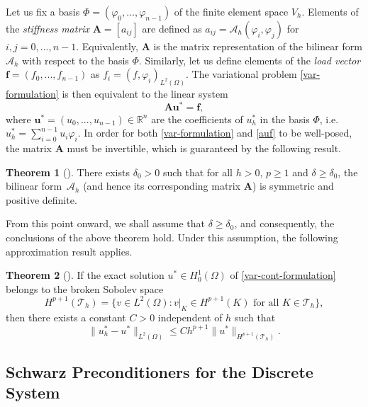 \documentclass[11pt]{article}
\theoremstyle{definition}
\theoremstyle{theorem}
\newtheorem{theorem}{Theorem}
\begin{document}
Let us fix a basis $\Phi=(\varphi_0, ..., \varphi_{n-1})$ of the finite element space $V_h$.
Elements of the \emph{stiffness matrix} ${\bm{A}=\left[a_{ij}\right]}$ are defined
as $a_{ij} = \mathcal{A}_h(\varphi_i, \varphi_j)$ for $i,j=0,...,n-1$. Equivalently,
$\bm{A}$ is the matrix representation of the bilinear form $\mathcal{A}_h$
with respect to the basis $\Phi$.
Similarly, let us define elements of the \emph{load vector} $\bm{f}=(f_0, ..., f_{n - 1})$
as $f_i = (f, \varphi_i)_{L^2(\Omega)}$. The variational problem
\eqref{var-formulation} is then equivalent to the linear system
\begin{equation}
  \bm{A} \bm{u^*} = \bm{f},\label{auf}
\end{equation}
where $\bm{u^*}=(u_0, ..., u_{n - 1})\in\mathbb{R}^n$ are the coefficients
of $u_h^*$ in the basis $\Phi$, i.e. $u_h^*=\sum_{i=0}^{n-1} u_i \varphi_i$.
In order for both \eqref{var-formulation} and \eqref{auf} to
be well-posed, the matrix $\bm{A}$ must
be invertible, which is guaranteed by the following result.

\begin{theorem}[\cite{Ern-weighted-dg}]\label{thm:spd}
  There exists $\delta_0>0$ such that for all $h>0$, $p\geq 1$ and $\delta \geq \delta_0$,
  the bilinear form~$\mathcal{A}_h$ (and hence its corresponding matrix $\bm{A}$)
  is symmetric and positive definite.
\end{theorem}

From this point onward, we shall assume that $\delta \geq \delta_0$, and consequently,
the conclusions of the above theorem hold. Under this assumption, the
following approximation result applies.

\begin{theorem}[\cite{Ern-weighted-dg}]
  If the exact solution $u^*\in H_0^1(\Omega)$ of
  \eqref{var-cont-formulation} belongs to the broken Sobolev space
  \[
    H^{p+1}(\mathcal{T}_h)=\{v \in L^2(\Omega) : v|_K \in H^{p+1}(K) \text{ for all } K\in \mathcal{T}_h\},
  \]
  then there exists a constant $C>0$ independent of $h$ such that
  \[
    \|u_h^* - u^*\|_{L^2(\Omega)} \leq C h^{p+1} \|u^*\|_{H^{p+1}(\mathcal{T}_h)}.
  \]
\end{theorem}

\subsection{Schwarz Preconditioners for the Discrete System}
\label{sec:additive-schwarz-method}
\end{document}
